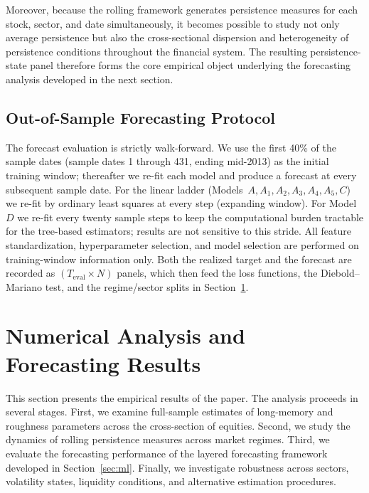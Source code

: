 \documentclass[unnumsec,webpdf,contemporary,large]{oup-authoring-template}%
\theoremstyle{thmstyleone}%
\theoremstyle{thmstyletwo}%
\theoremstyle{thmstylethree}%
\begin{document}
Moreover, because the rolling framework generates persistence measures for
each stock, sector, and date simultaneously, it becomes possible to study
not only average persistence but also the cross-sectional dispersion and
heterogeneity of persistence conditions throughout the financial system.
The resulting persistence-state panel therefore forms the core empirical
object underlying the forecasting analysis developed in the next section.
 

 

\subsection{Out-of-Sample Forecasting Protocol}

The forecast evaluation is strictly walk-forward. We use the first 40\%
of the sample dates (sample dates 1 through 431, ending mid-2013) as the
initial training window; thereafter we re-fit each model and produce a
forecast at every subsequent sample date. For the linear ladder
(Models~$A,A_1,A_2,A_3,A_4,A_5,C$) we re-fit by ordinary least squares
at every step (expanding window). For Model~$D$ we re-fit every twenty
sample steps to keep the computational burden tractable for the tree-based
estimators; results are not sensitive to this stride. All feature
standardization, hyperparameter selection, and model selection are
performed on training-window information only. Both the realized target
and the forecast are recorded as $(T_{\mathrm{eval}}\!\times\!N)$ panels,
which then feed the loss functions, the Diebold--Mariano test, and the
regime/sector splits in Section~\ref{sec:results}.

\section{Numerical Analysis and Forecasting Results}
\label{sec:results}

This section presents the empirical results of the paper. The analysis
proceeds in several stages. First, we examine full-sample estimates of
long-memory and roughness parameters across the cross-section of equities.
Second, we study the dynamics of rolling persistence measures across market
regimes. Third, we evaluate the forecasting performance of the layered
forecasting framework developed in Section~\ref{sec:ml}. Finally, we
investigate robustness across sectors, volatility states, liquidity
conditions, and alternative estimation procedures.
\end{document}
